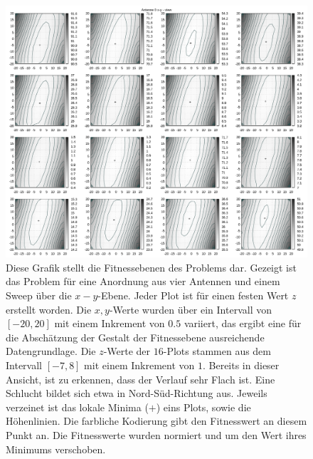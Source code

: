 %
\begin{figure}[h!]
  \caption[Fitness Ebenen Heatmap]{Diese Grafik stellt die Fitnessebenen des Problems dar. Gezeigt ist das Problem für eine Anordnung aus vier Antennen und einem Sweep über die $x-y$-Ebene. Jeder Plot ist für einen festen Wert $z$ erstellt worden. Die $x, y$-Werte wurden über ein Intervall von $[-20,20]$ mit einem Inkrement von $0.5$ variiert, das ergibt eine für die Abschätzung der Gestalt der Fitnessebene ausreichende Datengrundlage. Die $z$-Werte der $16$-Plots stammen aus dem Intervall $[-7,8]$ mit einem Inkrement von $1$. Bereits in dieser Ansicht, ist zu erkennen, dass der Verlauf sehr Flach ist. Eine Schlucht bildet sich etwa in Nord-Süd-Richtung aus. Jeweils verzeinet ist das lokale Minima ($+$) eins Plots, sowie die Höhenlinien. Die farbliche Kodierung gibt den Fitnesswert an diesem Punkt an. Die Fitnesswerte wurden normiert und um den Wert ihres Minimums verschoben.}
  \begin{center}
    \includegraphics[width=\textwidth]{img/fitness/xy_a0.png}
  \end{center}
  \label{fig:fitnessplane1-x-y-1}
%
\end{figure}

